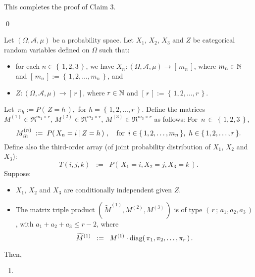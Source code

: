 This completes the proof of Claim 3.

\qed

\begin{corollary}
\mbox{}\vskip 0.1cm
\noindent
Let $\left(\Omega,\mathcal{A},\mu\right)$ be a probability space.
Let $X_{1}$, $X_{2}$, $X_{3}$ and $Z$ be categorical random variables defined on $\Omega$ such that:
\begin{itemize}
\item
	for each $n \in \left\{\,1, 2, 3\,\right\}$, we have
	$X_{n} : \left(\Omega,\mathcal{A},\mu\right) \longrightarrow \left[\,m_{n}\,\right]$,
	where $m_{n} \in \mathbb{N}$ and $\left[\,m_{n}\,\right] := \left\{\,1,2,\ldots,m_{n}\,\right\}$, and
\item
	$Z : \left(\Omega,\mathcal{A},\mu\right) \longrightarrow \left[\,r\,\right]$,
	where $r \in \mathbb{N}$ and $\left[\,r\,\right] := \left\{\,1,2,\ldots,r\,\right\}$.
\end{itemize}
Let \,$\pi_{h} := P\!\left(\,Z = h\,\right)$, \,for $h = \left\{\,1,2,\ldots,r\,\right\}$.
Define the matrices
$M^{(1)} \in \Re^{m_{1}\times r}$, 
$M^{(2)} \in \Re^{m_{2}\times r}$, 
$M^{(3)} \in \Re^{m_{3}\times r}$
as follows: For \,$n \,\in\, \left\{\,1,2,3\,\right\}$,
\begin{equation*}
M^{(n)}_{ih} \; := \; P\!\left(\,X_{n} = i \;\vert\, Z = h\,\right)\,,
\quad
\textnormal{for \,$i \in \left\{\,1,2,\ldots,m_{n}\,\right\}$, \,$h \in \left\{\,1,2,\ldots,r\,\right\}$}.
\end{equation*}
Define also the third-order array (of joint probability distribution of $X_{1}$, $X_{2}$ and $X_{3}$):
\begin{equation*}
T(i,j,k) \;\; := \;\; P\!\left(\,X_{1} = i, X_{2} = j, X_{3} = k \,\right).
\end{equation*}
Suppose:
\begin{itemize}
\item
	$X_{1}$, $X_{2}$ and $X_{3}$ are conditionally independent given $Z$.
\item
	The matrix triple product
	$\left(\,\widetilde{M}^{(1)},M^{(2)},M^{(3)}\,\right)$ is of type $\left(\,r\,;\,a_{1},a_{2},a_{3}\,\right)$,
	with $a_{1} + a_{2} + a_{3} \leq r - 2$, where
	\begin{equation*}
	\widetilde{M}^{(1)} \;\; := \;\; M^{(1)}\cdot\textnormal{diag}\!\left(\,\pi_{1},\pi_{2},\ldots,\pi_{r}\,\right).
	\end{equation*}
\end{itemize}
Then,
\begin{enumerate}
\item

\end{enumerate}
\end{corollary}
